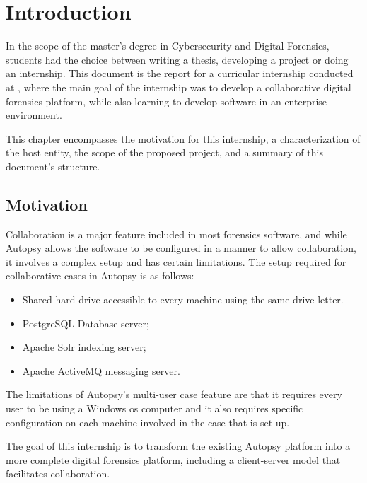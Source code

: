 
\chapter{Introduction}
\label{ch:introduction}

In the scope of the master's degree in Cybersecurity and Digital Forensics, students had the choice between writing a thesis, developing a project or doing an internship.
This document is the report for a curricular internship conducted at \company \cite{void}, where the main goal of the internship was to develop a collaborative digital forensics platform,
while also learning to develop software in an enterprise environment.

This chapter encompasses the motivation for this internship, a characterization of the host entity, the scope of the proposed project, and a summary of this document's structure.

\section{Motivation}

Collaboration is a major feature included in most forensics software, and while Autopsy \cite{autopsy} allows the software to be
configured in a manner to allow collaboration, it involves a complex setup and has certain limitations.
The setup required for collaborative cases in Autopsy is as follows:
\begin{itemize}
 \item Shared hard drive accessible to every machine using the same drive letter.
 \item PostgreSQL \cite{postgresql} Database server;
 \item Apache Solr \cite{solr} indexing server;
 \item Apache ActiveMQ \cite{activemq} messaging server.
\end{itemize}

The limitations of Autopsy's multi-user case feature are that it requires every user to be using a Windows \cite{windows} \acrfull{os} computer and it also requires specific configuration on each
machine involved in the case that is set up.

The goal of this internship is to transform the existing Autopsy platform into a more complete digital forensics platform, including a client-server model that facilitates collaboration.

